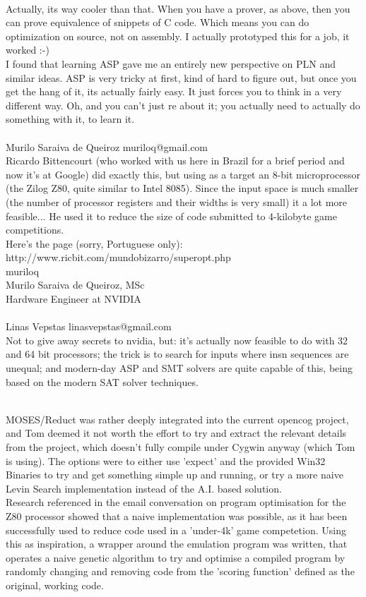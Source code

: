 \documentclass[11pt]{article}
\begin{document}
\\Actually, its way cooler than that. When you have a prover, as above, then you can prove equivalence of snippets of C code. Which means you can do optimization on source, not on assembly. I actually prototyped this for a job, it worked :-)
\\I found that learning ASP gave me an entirely new perspective on PLN and similar ideas. ASP is very tricky at first, kind of hard to figure out, but once you get the hang of it, its actually fairly easy. It just forces you to think in a very different way. Oh, and you can't just re about it; you actually need to actually do something with it, to learn it.
\\
\\
Murilo Saraiva de Queiroz muriloq@gmail.com
\\Ricardo Bittencourt (who worked with us here in Brazil for a brief period and now it's at Google) did exactly this, but using as a target an 8-bit microprocessor (the Zilog Z80, quite similar to Intel 8085). Since the input space is much smaller (the number of processor registers and their widths is very small) it a lot more feasible... He used it to reduce the size of code submitted to 4-kilobyte game competitions. 
\\Here's the page (sorry, Portuguese only):
\\ http://www.ricbit.com/mundobizarro/superopt.php 
\\muriloq
\\Murilo Saraiva de Queiroz, MSc
\\Hardware Engineer at NVIDIA
\\
\\
Linas Vepstas linasvepstas@gmail.com
\\Not to give away secrets to nvidia, but: it's actually now feasible to do with 32 and 64 bit processors; the trick is to search for inputs where insn sequences are unequal; and modern-day ASP and SMT solvers are quite capable of this, being based on the modern SAT solver techniques.
\\
\\\hrulefill



\indent MOSES/Reduct was rather deeply integrated into the current opencog project, and Tom deemed it not worth the effort to try and extract the relevant details from the project, which doesn't fully compile under Cygwin anyway (which Tom is using). The options were to either use 'expect' and the provided Win32 Binaries to try and get something simple up and running, or try a more naive Levin Search implementation instead of the A.I. based solution. 
\\
\indent Research referenced in the email conversation on program optimisation for the Z80 processor showed that a naive implementation was possible, as it has been successfully used to reduce code used in a 'under-4k' game competetion. Using this as inspiration, a wrapper around the emulation program was written, that operates a naive genetic algorithm to try and optimise a compiled program by randomly changing and removing code from the 'scoring function' defined as the original, working code.
\end{document}
